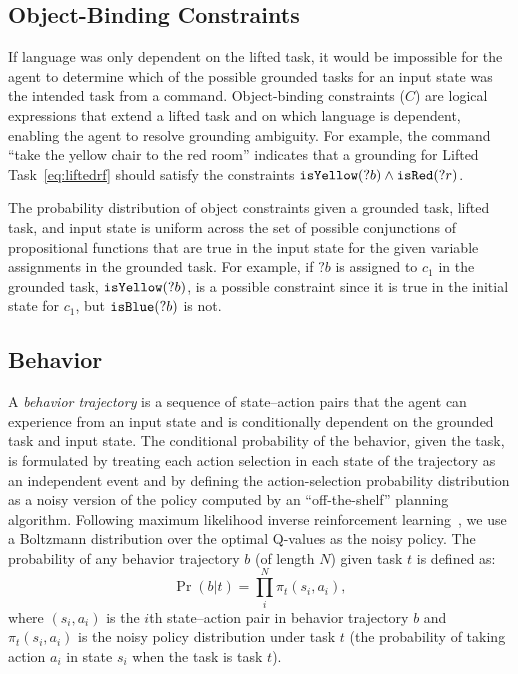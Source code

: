 \documentclass[conference]{IEEEtran}
\begin{document}
\subsection{Object-Binding Constraints}
If language was only dependent on the lifted task, it would be impossible for the agent to determine which of the possible grounded tasks for an input state was the intended task from a command.
Object-binding constraints ($C$) are logical expressions that extend a lifted task and on which language is dependent, enabling the agent to resolve grounding ambiguity. 
For example, the command ``take the yellow chair to the red room'' indicates that a grounding for Lifted Task~\ref{eq:liftedrf} should satisfy the constraints ${\tt isYellow}(?b) \land {\tt isRed}(?r)$.

The probability distribution of object constraints given a grounded task, lifted task, and input state is uniform across the set of possible conjunctions of propositional functions that are true in the input state for the given variable assignments in the grounded task. For example, if $?b$ is assigned to $c_1$ in the grounded task, ${\tt isYellow}(?b)$, is a possible constraint since it is true in the initial state for $c_1$, but ${\tt isBlue}(?b)$ is not.

\subsection{Behavior}
A \emph{behavior trajectory} is a sequence of state--action pairs that the agent can experience from an input state and is conditionally dependent on the grounded task and input state. The conditional probability of the behavior, given the task, is formulated by treating each action selection in each state of the trajectory as an independent event and by defining the action-selection probability distribution as a noisy version of the policy computed by an ``off-the-shelf'' planning algorithm. Following maximum likelihood inverse reinforcement learning~\cite{babes11}, we use a Boltzmann distribution over the optimal Q-values as the noisy policy. The probability of any behavior trajectory $b$ (of length $N$) given task $t$ is defined as:
\begin{equation}
\label{eq:trajProb}
\Pr(b | t) = \prod^N_i \pi_t(s_i, a_i), 
\end{equation}
where $(s_i, a_i)$ is the $i$th state--action pair in behavior trajectory $b$ and $\pi_t(s_i, a_i)$ is the noisy policy distribution under task $t$ (the probability of taking action $a_i$ in state $s_i$ when the task is task $t$). 
\end{document}
